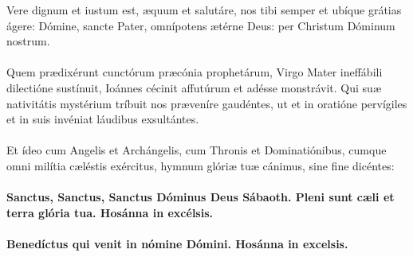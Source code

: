 \documentclass[12pt, a4paper]{article}
\begin{document}
	\\
	\\
	\\
	\\
	\\
	Vere dignum et iustum est, æquum
	et salutáre, nos tibi semper et
	ubíque grátias ágere: Dómine,
	sancte Pater, omnípotens ætérne
	Deus: per Christum Dóminum
	nostrum.
	\\\\
	Quem prædixérunt cunctórum
	præcónia prophetárum, Virgo
	Mater ineffábili dilectióne sustínuit,
	Ioánnes cécinit affutúrum et adésse
	monstrávit. Qui suæ nativitátis
	mystérium tríbuit nos præveníre
	gaudéntes, ut et in oratióne
	pervígiles et in suis invéniat
	láudibus exsultántes.
	\\\\
	Et ídeo cum Angelis et
	Archángelis, cum Thronis et
	Dominatiónibus, cumque omni
	milítia cæléstis exércitus, hymnum
	glóriæ tuæ cánimus, sine fine
	dicéntes:
	\\\\
	\textbf{Sanctus, Sanctus, Sanctus Dóminus
		Deus Sábaoth. Pleni sunt cæli et
		terra glória tua. Hosánna in
		excélsis.}
	\\\\
	\textbf{Benedíctus qui venit in nómine
		Dómini. Hosánna in excelsis.}
	
	\newpage
	
\end{document}
